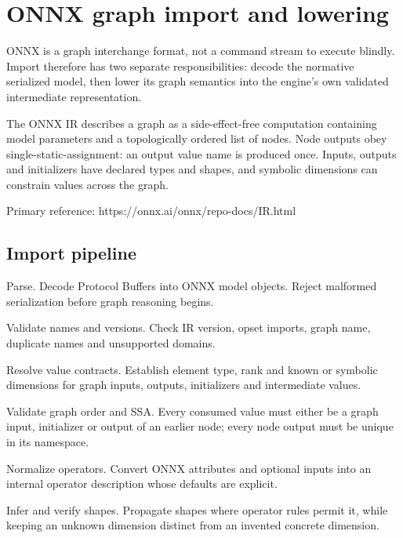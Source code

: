 \hypertarget{appendix-a87217e3af2b}{}\label{referencestart:appendix-a87217e3af2b}
\section{ONNX graph import and lowering}\label{appendix-a87217e3af2b-onnx-graph-import-and-lowering}

\hypertarget{appendix-a87217e3af2b-onnx-graph-import-and-lowering}{}

ONNX is a graph interchange format, not a command stream to execute blindly. Import therefore has two separate responsibilities: decode the normative serialized model, then lower its graph semantics into the engine's own validated intermediate representation.

The ONNX IR describes a graph as a side-effect-free computation containing model parameters and a topologically ordered list of nodes. Node outputs obey single-static-assignment: an output value name is produced once. Inputs, outputs and initializers have declared types and shapes, and symbolic dimensions can constrain values across the graph.

Primary reference: https://onnx.ai/onnx/repo-docs/IR.html

\subsection{Import pipeline}\label{appendix-a87217e3af2b-import-pipeline}

\hypertarget{appendix-a87217e3af2b-import-pipeline}{}

Parse. Decode Protocol Buffers into ONNX model objects. Reject malformed serialization before graph reasoning begins.

Validate names and versions. Check IR version, opset imports, graph name, duplicate names and unsupported domains.

Resolve value contracts. Establish element type, rank and known or symbolic dimensions for graph inputs, outputs, initializers and intermediate values.

Validate graph order and SSA. Every consumed value must either be a graph input, initializer or output of an earlier node; every node output must be unique in its namespace.

Normalize operators. Convert ONNX attributes and optional inputs into an internal operator description whose defaults are explicit.

Infer and verify shapes. Propagate shapes where operator rules permit it, while keeping an unknown dimension distinct from an invented concrete dimension.

